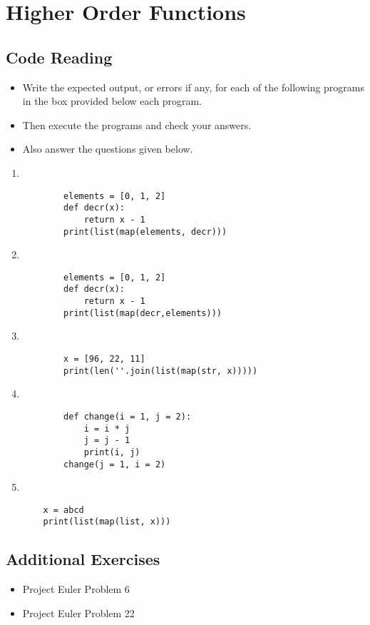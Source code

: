 \documentclass[11pt,a4paper]{article}
\def\AnswerBox{\fbox{\begin{minipage}{4in}\hfill\vspace{0.5in}\end{minipage}}}
\begin{document}
\section*{Higher Order Functions}

\subsection*{Code Reading}
\begin{itemize}
    \item Write the expected output, or errors if any, for each of the following programs in the box provided below each program.
    \item Then execute the programs and check your answers.
    \item Also answer the questions given below.
\end{itemize}

\begin{enumerate}[label=\bfseries Program \arabic*:]
    \item ~
    \begin{lstlisting}
        elements = [0, 1, 2]
        def decr(x):
            return x - 1
        print(list(map(elements, decr)))
    \end{lstlisting}
    \AnswerBox
    \item ~
    \begin{lstlisting}
        elements = [0, 1, 2]
        def decr(x):
            return x - 1
        print(list(map(decr,elements)))
    \end{lstlisting}
    \AnswerBox
    \item ~
    \begin{lstlisting}
        x = [96, 22, 11]
        print(len(''.join(list(map(str, x)))))
    \end{lstlisting}
    \AnswerBox
    \item ~
    \begin{lstlisting}
        def change(i = 1, j = 2):
            i = i * j
            j = j - 1
            print(i, j)
        change(j = 1, i = 2)
    \end{lstlisting}
    \AnswerBox
    \item ~
    \begin{lstlisting}
    x = abcd
    print(list(map(list, x)))
    \end{lstlisting}
    \AnswerBox
\end{enumerate}
\subsection*{Additional Exercises}
\begin{itemize}
    \item Project Euler Problem 6
    \item Project Euler Problem 22
\end{itemize}
\end{document}
